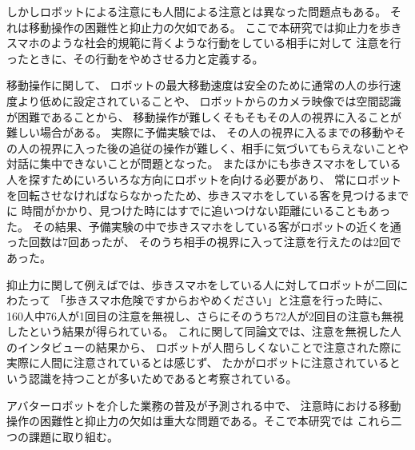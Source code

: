 \documentclass{kuisthesis}
\begin{document}
しかしロボットによる注意にも人間による注意とは異なった問題点もある。
それは移動操作の困難性と抑止力の欠如である。
ここで本研究では抑止力を歩きスマホのような社会的規範に背くような行動をしている相手に対して
注意を行ったときに、その行動をやめさせる力と定義する。

移動操作に関して、
ロボットの最大移動速度は安全のために通常の人の歩行速度より低めに設定されていることや、
ロボットからのカメラ映像では空間認識が困難であることから、
移動操作が難しくそもそもその人の視界に入ることが難しい場合がある。
実際に予備実験では、%
その人の視界に入るまでの移動やその人の視界に入った後の追従の操作が難しく、相手に気づいてもらえないことや
対話に集中できないことが問題となった。
またほかにも歩きスマホをしている人を探すためにいろいろな方向にロボットを向ける必要があり、
常にロボットを回転させなければならなかったため、歩きスマホをしている客を見つけるまでに
時間がかかり、見つけた時にはすでに追いつけない距離にいることもあった。
その結果、予備実験の中で歩きスマホをしている客がロボットの近くを通った回数は7回あったが、
そのうち相手の視界に入って注意を行えたのは2回であった。

抑止力に関して例えば\cite{Schneider2022}では、歩きスマホをしている人に対してロボットが二回にわたって
「歩きスマホ危険ですからおやめください」と注意を行った時に、
160人中76人が1回目の注意を無視し、さらにそのうち72人が2回目の注意も無視したという結果が得られている。
これに関して同論文では、注意を無視した人のインタビューの結果から、
ロボットが人間らしくないことで注意された際に実際に人間に注意されているとは感じず、
たかがロボットに注意されているという認識を持つことが多いためであると考察されている。

アバターロボットを介した業務の普及が予測される中で、
注意時における移動操作の困難性と抑止力の欠如は重大な問題である。そこで本研究では
これら二つの課題に取り組む。
\end{document}

